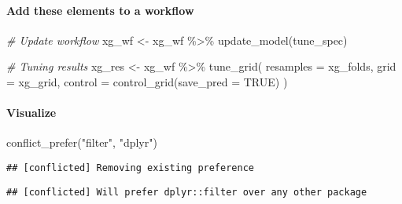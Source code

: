 \documentclass[
]{book}
\newenvironment{Shaded}{\begin{snugshade}}{\end{snugshade}}
\newcommand{\AttributeTok}[1]{\textcolor[rgb]{0.77,0.63,0.00}{#1}}
\newcommand{\CommentTok}[1]{\textcolor[rgb]{0.56,0.35,0.01}{\textit{#1}}}
\newcommand{\ConstantTok}[1]{\textcolor[rgb]{0.00,0.00,0.00}{#1}}
\newcommand{\FunctionTok}[1]{\textcolor[rgb]{0.00,0.00,0.00}{#1}}
\newcommand{\NormalTok}[1]{#1}
\newcommand{\OtherTok}[1]{\textcolor[rgb]{0.56,0.35,0.01}{#1}}
\newcommand{\SpecialCharTok}[1]{\textcolor[rgb]{0.00,0.00,0.00}{#1}}
\newcommand{\StringTok}[1]{\textcolor[rgb]{0.31,0.60,0.02}{#1}}
\begin{document}
\hypertarget{add-these-elements-to-a-workflow-3}{%
\paragraph{Add these elements to a workflow}\label{add-these-elements-to-a-workflow-3}}

\begin{Shaded}
\begin{Highlighting}[]
\CommentTok{\# Update workflow }
\NormalTok{xg\_wf }\OtherTok{\textless{}{-}}\NormalTok{ xg\_wf }\SpecialCharTok{\%\textgreater{}\%} \FunctionTok{update\_model}\NormalTok{(tune\_spec)}

\CommentTok{\# Tuning results }
\NormalTok{xg\_res }\OtherTok{\textless{}{-}}\NormalTok{ xg\_wf }\SpecialCharTok{\%\textgreater{}\%}
  \FunctionTok{tune\_grid}\NormalTok{(}
    \AttributeTok{resamples =}\NormalTok{ xg\_folds, }
    \AttributeTok{grid =}\NormalTok{ xg\_grid,}
    \AttributeTok{control =} \FunctionTok{control\_grid}\NormalTok{(}\AttributeTok{save\_pred =} \ConstantTok{TRUE}\NormalTok{)}
\NormalTok{  )}
\end{Highlighting}
\end{Shaded}

\hypertarget{visualize-3}{%
\paragraph{Visualize}\label{visualize-3}}

\begin{Shaded}
\begin{Highlighting}[]
\FunctionTok{conflict\_prefer}\NormalTok{(}\StringTok{"filter"}\NormalTok{, }\StringTok{"dplyr"}\NormalTok{)}
\end{Highlighting}
\end{Shaded}

\begin{verbatim}
## [conflicted] Removing existing preference
\end{verbatim}

\begin{verbatim}
## [conflicted] Will prefer dplyr::filter over any other package
\end{verbatim}
\end{document}
